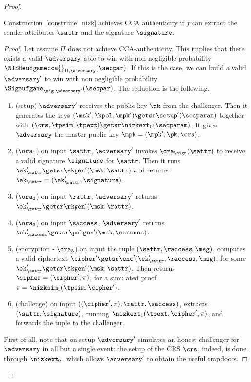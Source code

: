 \begin{proof}
    \begin{lemma}\label{lemma:me_auth}
        Construction~\ref{constr:me_nizk} achieves CCA authenticity if $f$ can extract the sender attributes $\sattr$ and the signature $\signature$.
        \begin{proof}
            Let assume $\Pi$ does not achieve CCA-authenticity. This implies that there exists a valid $\adversary$ able to win with non negligible probability $\NISHeufgamecca{}_{\Pi, \adversary}(\secpar)$. If this is the case, we can build a valid $\adversary'$ to win with non negligible probability $\Sigeufgame_{\sig, \adversary'}(\secpar)$. The reduction is the following.

            \begin{enumerate}
                \item (setup) $\adversary'$ receives the public key $\pk$ from the challenger. Then it generates the keys $(\msk', \kpol, \mpk') \getsr \setup'(\secparam)$ together with $(\crs,\tpsim,\tpext)\getsr\nizkext_0(\secparam)$. It gives $\adversary$ the master public key $\mpk = (\mpk', \pk, \crs)$.
                \item ($\ora_1$) on input $\sattr$, $\adversary'$ invokes $\ora_\sign(\sattr)$ to receive a valid signature $\signature$ for $\sattr$. Then it runs $\ek'_\sattr \getsr \skgen'(\msk, \sattr)$ and returns $\ek_\sattr = (\ek_\sattr', \signature)$.
                \item ($\ora_2$) on input $\rattr$, $\adversary'$ returns $\ek'_\rattr \getsr \rkgen'(\msk, \rattr)$.
                \item ($\ora_3$) on input $\saccess$, $\adversary'$ returns $\ek'_\saccess \getsr \polgen'(\msk, \saccess)$.
                \item (encryption - $\ora_5$) on input the tuple $(\sattr, \raccess, \msg)$, computes a valid ciphertext $\cipher' \getsr \enc'(\ek'_\sattr, \raccess, \msg)$, for some $\ek'_\sattr \getsr \skgen'(\msk, \sattr)$. Then returns $\cipher = (\cipher', \pi)$, for a simulated proof $\pi = \nizksim_1(\tpsim, \cipher')$.
                \item (challenge) on input $((\cipher', \pi), \rattr, \saccess)$, extracts $(\sattr, \signature)$, running $\nizkext_1(\tpext, \cipher', \pi)$, and forwards the tuple to the challenger.
            \end{enumerate}
            First of all, note that on setup $\adversary'$ simulates an honest challenger for $\adversary$ in all but a single event: the setup of the CRS $\crs$, indeed, is done through $\nizkext_0$, which allows $\adversary'$ to obtain the useful trapdoors.

\end{proof}
\end{lemma}
\end{proof}
